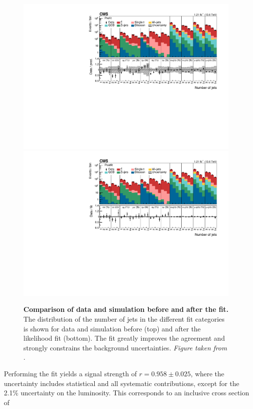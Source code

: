 \begin{figure}[!ht]
\centering
\includegraphics[width=0.99\textwidth]{figures/ttxs/prefithist.pdf}
\includegraphics[width=0.99\textwidth]{figures/ttxs/postfithist.pdf}

\caption{
   \textbf{Comparison of data and simulation before and after the fit.} The distribution of the number of jets in the different fit categories is shown for data and simulation before (top) and after the likelihood fit (bottom). The fit greatly improves the agreement and strongly constrains the background uncertainties. \textit{Figure taken from }.
}
\label{fig:ttxs:prepostfit}
\end{figure}

Performing the fit yields a \ttbar signal strength of $r = 0.958 \pm 0.025$, where the uncertainty includes statistical and all systematic contributions, except for the 2.1\% uncertainty on the luminosity. This corresponds to an inclusive \ttbar cross section of

